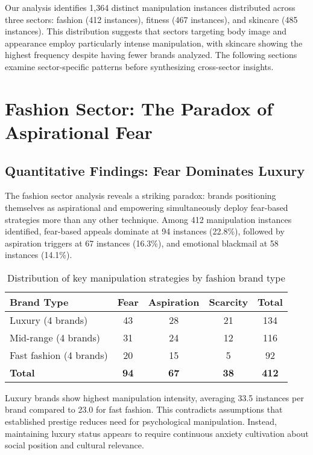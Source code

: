 Our analysis identifies 1,364 distinct manipulation instances distributed across three sectors: fashion (412 instances), fitness (467 instances), and skincare (485 instances). This distribution suggests that sectors targeting body image and appearance employ particularly intense manipulation, with skincare showing the highest frequency despite having fewer brands analyzed. The following sections examine sector-specific patterns before synthesizing cross-sector insights.

\section{Fashion Sector: The Paradox of Aspirational Fear}
\label{sec:fashion_analysis}

\subsection{Quantitative Findings: Fear Dominates Luxury}

The fashion sector analysis reveals a striking paradox: brands positioning themselves as aspirational and empowering simultaneously deploy fear-based strategies more than any other technique. Among 412 manipulation instances identified, fear-based appeals dominate at 94 instances (22.8\%), followed by aspiration triggers at 67 instances (16.3\%), and emotional blackmail at 58 instances (14.1\%).

\begin{table}[h]
\centering
\begin{tabular}{|l|c|c|c|c|}
\hline
\textbf{Brand Type} & \textbf{Fear} & \textbf{Aspiration} & \textbf{Scarcity} & \textbf{Total} \\
\hline
Luxury (4 brands) & 43 & 28 & 21 & 134 \\
Mid-range (4 brands) & 31 & 24 & 12 & 116 \\
Fast fashion (4 brands) & 20 & 15 & 5 & 92 \\
\hline
\textbf{Total} & \textbf{94} & \textbf{67} & \textbf{38} & \textbf{412} \\
\hline
\end{tabular}
\caption{Distribution of key manipulation strategies by fashion brand type}
\end{table}

Luxury brands show highest manipulation intensity, averaging 33.5 instances per brand compared to 23.0 for fast fashion. This contradicts assumptions that established prestige reduces need for psychological manipulation. Instead, maintaining luxury status appears to require continuous anxiety cultivation about social position and cultural relevance.

